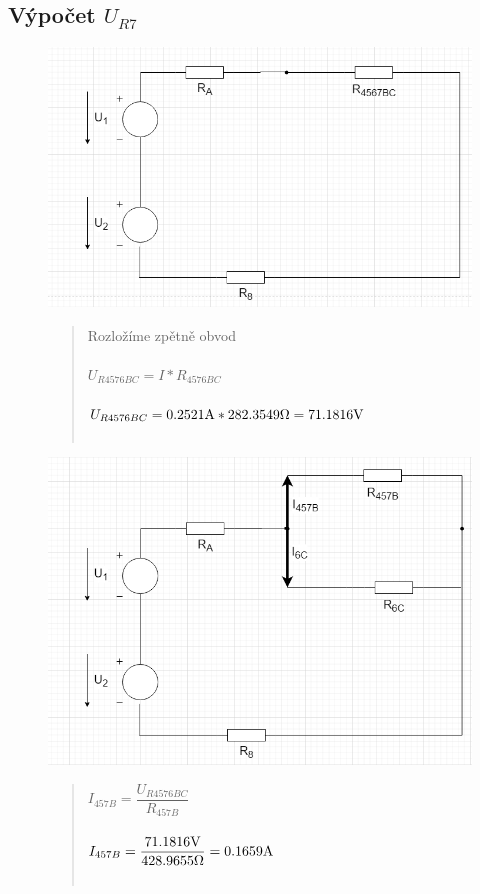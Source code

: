 \subsection{Výpočet $U_{R7}$}

\begin{figure}[H]
    \centering
    \includegraphics[scale=0.5]{picturesFor1Uloha/9.png}
    \begin{quote}
        \centering
	    Rozložíme zpětně obvod \\~\\
	    $U_{R4576BC} = I * R_{4576BC}$ \\~\\
	    $U_{R4576BC} = 0.2521\Am * 282.3549\Omega = 71.1816\Vo$ \\~\\
    \end{quote}
\end{figure}
\begin{figure}[H]
    \centering
    \includegraphics[scale=0.5]{picturesFor1Uloha/10.png}
    \begin{quote}
        \centering
        $I_{457B} = \dfrac{U_{R4576BC}}{R_{457B}} $ \\~\\
	    $I_{457B} = \dfrac{71.1816\Vo}{428.9655\Omega} = 0.1659\Am $ \\~\\
    \end{quote}
\end{figure}
